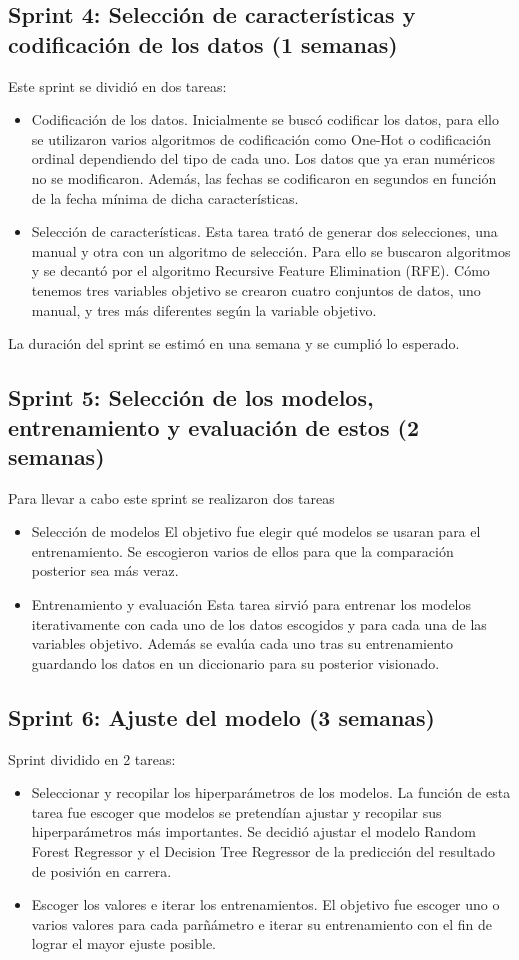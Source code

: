 \subsection{Sprint 4: Selección de características y codificación de los datos (1 semanas)}
Este sprint se dividió en dos tareas:
\begin{itemize}
\item 
    Codificación de los datos.
    Inicialmente se buscó codificar los datos, para ello se utilizaron varios algoritmos de codificación como One-Hot o codificación ordinal dependiendo del tipo de cada uno. Los datos que ya eran numéricos no se modificaron. Además, las fechas se codificaron en segundos en función de la fecha mínima de dicha características.
    \item 
    Selección de características.
    Esta tarea trató de generar dos selecciones, una manual y otra con un algoritmo de selección. Para ello se buscaron algoritmos y se decantó por el algoritmo Recursive Feature Elimination (RFE). Cómo tenemos tres variables objetivo se crearon cuatro conjuntos de datos, uno manual, y tres más diferentes según la variable objetivo.
\end{itemize}
La duración del sprint se estimó en una semana y se cumplió lo esperado.

\subsection{Sprint 5: Selección de los modelos, entrenamiento y evaluación de estos (2 semanas)}
Para llevar a cabo este sprint se realizaron dos tareas
\begin{itemize}
    \item Selección de modelos
    El objetivo fue elegir qué modelos se usaran para el entrenamiento. Se escogieron varios de ellos para que la comparación posterior sea más veraz.
    \item Entrenamiento y evaluación
    Esta tarea sirvió para entrenar los modelos iterativamente con cada uno de los datos escogidos y para cada una de las variables objetivo. Además se evalúa cada uno tras su entrenamiento guardando los datos en un diccionario para su posterior visionado.
\end{itemize}

\subsection{Sprint 6: Ajuste del modelo (3 semanas)}
Sprint dividido en 2 tareas:
\begin{itemize}
    \item 
    Seleccionar y recopilar los hiperparámetros de los modelos.
    La función de esta tarea fue escoger que modelos se pretendían ajustar y recopilar sus hiperparámetros más importantes. Se decidió ajustar el modelo Random Forest Regressor y el Decision Tree Regressor de la predicción del resultado de posivión en carrera.
    \item 
    Escoger los valores e iterar los entrenamientos.
    El objetivo fue escoger uno o varios valores para cada parñámetro e iterar su entrenamiento con el fin de lograr el mayor ejuste posible.
\end{itemize}

